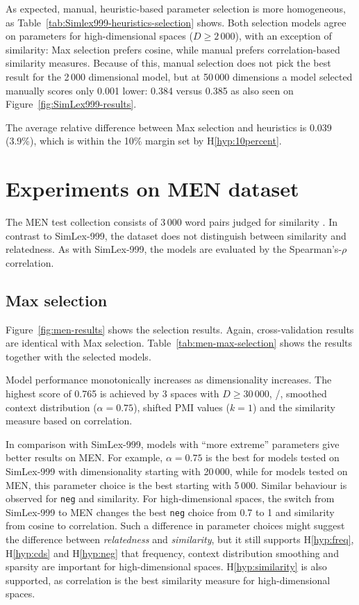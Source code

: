 As expected, manual, heuristic-based parameter selection is more homogeneous, as Table~\ref{tab:Simlex999-heuristics-selection} shows. Both selection models agree on parameters for high-dimensional spaces ($D \geq 2\,000$), with an exception of similarity: Max selection prefers cosine, while manual prefers correlation-based similarity measures. Because of this, manual selection does not pick the best result for the 2\,000 dimensional model, but at 50\,000 dimensions a model selected manually scores only 0.001 lower: 0.384 versus 0.385 as also seen on Figure~\ref{fig:SimLex999-results}.

The average relative difference between Max selection and heuristics is 0.039 (3.9\%), which is within the 10\% margin set by H\ref{hyp:10percent}.

\section{Experiments on MEN dataset}
\label{sec:men}



The MEN test collection consists of 3\,000 word pairs judged for similarity \cite{Bruni:2014:MDS:2655713.2655714}. In contrast to SimLex-999, the dataset does not distinguish between similarity and relatedness. As with SimLex-999, the models are evaluated by the Spearman's-$\rho$ correlation.

\subsection{Max selection}
\label{sec:max-selection-men}



Figure~\ref{fig:men-results} shows the selection results. Again, cross-validation results are identical with Max selection. Table~\ref{tab:men-max-selection} shows the results together with the selected models.

Model performance monotonically increases as dimensionality increases. The highest score of 0.765 is achieved by 3 spaces with $D \geq 30\,000$, \logNSCPMI/, smoothed context distribution ($\alpha = 0.75$), shifted PMI values ($k = 1$) and the similarity measure based on correlation.

In comparison with SimLex-999, models with ``more extreme'' parameters give better results on MEN. For example, $\alpha = 0.75$ is the best for models tested on SimLex-999 with dimensionality starting with 20\,000, while for models tested on MEN, this parameter choice is the best starting with 5\,000. Similar behaviour is observed for \texttt{neg} and similarity. For high-dimensional spaces, the switch from SimLex-999 to MEN changes the best \texttt{neg} choice from 0.7 to 1 and similarity from cosine to correlation. Such a difference in parameter choices might suggest the difference between \textit{relatedness} and \textit{similarity}, but it still supports H\ref{hyp:freq}, H\ref{hyp:cds} and H\ref{hyp:neg} that frequency, context distribution smoothing and sparsity are important for high-dimensional spaces. H\ref{hyp:similarity} is also supported, as correlation is the best similarity measure for high-dimensional spaces.

